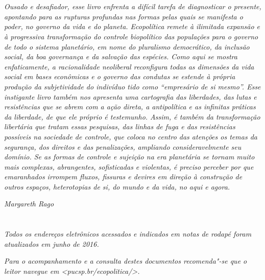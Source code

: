 \chapter*{}

\vspace*{\fill}

\begin{flushright}
\begin{adjustwidth}{2.0cm}{}
\raggedleft\small\emph{Ousado e desafiador, esse livro enfrenta a difícil tarefa de
diagnosticar o presente, apontando para as rupturas profundas nas formas
pelas quais se manifesta o poder, no governo da vida e do planeta.
\emph{Ecopolítica} remete à ilimitada expansão e à progressiva
transformação do controle biopolítico das populações para o governo de
todo o sistema planetário, em nome do pluralismo democrático, da
inclusão social, da boa governança e da salvação das espécies. Como aqui
se mostra enfaticamente, a racionalidade neoliberal reconfigura todas as
dimensões da vida social em bases econômicas e o governo das condutas se
estende à própria produção da subjetividade do indivíduo tido como
``empresário de si mesmo''. Esse instigante livro também nos apresenta
uma cartografia das liberdades, das lutas e resistências que se abrem
com a ação direta, a antipolítica e as infinitas práticas da liberdade,
de que ele próprio é testemunho. Assim, é também da transformação
libertária que tratam essas pesquisas, das linhas de fuga e das
resistências possíveis na sociedade de controle, que coloca no centro
das atenções os temas da segurança, dos direitos e das penalizações,
ampliando consideravelmente seu domínio. Se as formas de controle e
sujeição na era planetária se tornam muito mais complexas, abrangentes,
sofisticadas e violentas, é preciso perceber por que emaranhados
irrompem fluxos, fissuras e devires em direção à construção de outros
espaços, heterotopias de si, do mundo e da vida, no aqui e agora.}

\medskip

\emph{Margareth Rago}
\end{adjustwidth}
\end{flushright}
\thispagestyle{empty}

\chapter*{}

\vspace{\fill}
\emph{Todos os endereços eletrônicos acessados e indicados em notas de rodapé
foram atualizados em junho de 2016.}

\medskip

\noindent\emph{Para o acompanhamento e a consulta destes documentos recomenda"-se que o
leitor navegue em \textless{}\emph{pucsp.br/ecopolitica/}\textgreater{}.}
\thispagestyle{empty}
